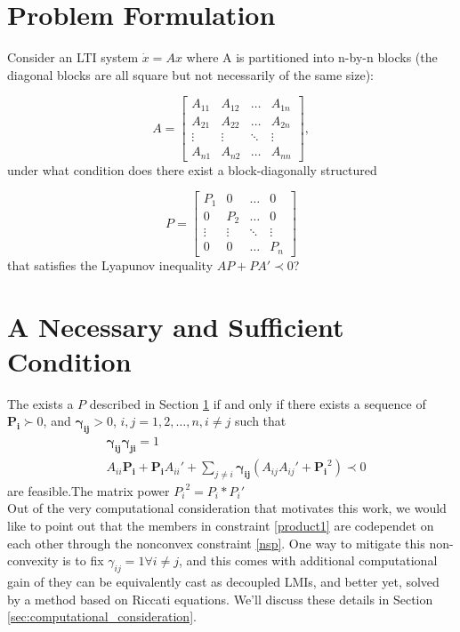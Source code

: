 \documentclass{article}
\begin{document}
\section{Problem Formulation} %
\label{sec:problem_formulation}
Consider an LTI system $\dot x =Ax$ where A is partitioned into n-by-n blocks (the diagonal blocks are all square but not necessarily of the same size):

\[A=
\begin{bmatrix}
  A_{11} & A_{12}    & \dots  & A_{1n} \\
    A_{21} & A_{22}  & \dots  & A_{2n} \\
    \vdots & \vdots  & \ddots & \vdots \\
    A_{n1} & A_{n2}  & \dots  & A_{nn}
\end{bmatrix},
\]under what condition does there exist a block-diagonally structured 

\[
P=
\begin{bmatrix}
  P_{1} & 0 & \dots  & 0\\
  0 & P_{2} & \dots  & 0 \\
    \vdots  & \vdots & \ddots & \vdots \\
    0& 0  & \dots  & P_{n}
\end{bmatrix}
\] that satisfies the Lyapunov inequality $AP+PA'\prec0$?


\section{A Necessary and Sufficient Condition} %
\label{sec:generalization}
The exists a $P$ described in Section \ref{sec:problem_formulation} if and only if there exists a sequence of $\pmb{P_i} \succ 0$, and $\pmb{\gamma_{ij}}>0$, $i,j=1,2,\dots,n, i\neq j$ such that
\begin{subequations}
\begin{align}
&\pmb{\gamma_{ij}}\pmb{\gamma_{ji}}=1 \label{product1}\\
&A_{ii}\pmb{P_i}+\pmb{P_i}A_{ii}'+\sum\limits_{j \neq i}\pmb{\gamma_{ij}}(A_{ij}A_{ij}'+\pmb{P_i}^2)\prec 0 \label{nsp}
\end{align}

\end{subequations} are feasible.The matrix power ${P_i}^2=P_i*P_i'$\\

Out of the very computational consideration that motivates this work, we would like to point out that the members in constraint \eqref{product1} are codependet on each other through the nonconvex constraint \eqref{nsp}. One way to mitigate this non-convexity is to fix $\gamma_{ij}=1 \forall i\neq j$, and this comes with additional computational gain of they can be equivalently cast as decoupled LMIs, and better yet, solved by a method based on Riccati equations. We'll discuss these details in Section \ref{sec:computational_consideration}.
\end{document}

